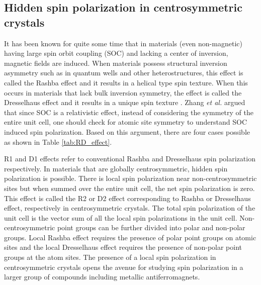 \documentclass[letterpaper,10pt,doublespacing,edeposit]{uiucthesis2020}
\begin{document}
\begin{mainmatter}
\section{Hidden spin polarization in centrosymmetric crystals}

It has been known for quite some time that in materials (even non-magnetic) having large spin orbit coupling (SOC) and lacking a center of inversion, magnetic fields are induced. When materials possess structural inversion asymmetry such as in quantum wells and other heterostructures, this effect is called the Rashba effect and it results in a helical type spin texture. When this occurs in materials that lack bulk inversion symmetry, the effect is called the Dresselhaus effect and it results in a unique spin texture \cite{Zhang2014}. Zhang \emph{et al.} \cite{Zhang2014} argued that since SOC is a relativistic effect, instead of considering the symmetry of the entire unit cell, one should check for atomic site symmetry to understand SOC induced spin polarization. Based on this argument, there are four cases possible as shown in Table \ref{tab:RD_effect}.

R1 and D1 effects refer to conventional Rashba and Dresselhaus spin polarization respectively. In materials that are globally centrosymmetric, hidden spin polarization is possible. There is local spin polarization near non-centrosymmetric sites but when summed over the entire unit cell, the net spin polarization is zero. This effect is called the R2 or D2 effect corresponding to Rashba or Dresselhaus effect, respectively in centrosymmetric crystals. The total spin polarization of the unit cell is the vector sum of all the local spin polarizations in the unit cell. Non-centrosymmetric point groups can be further divided into polar and non-polar groups. Local Rashba effect requires the presence of polar point groups on atomic sites and the local Dresselhaus effect requires the presence of non-polar point groups at the atom sites. The presence of a local spin polarization in centrosymmetric crystals opens the avenue for studying spin polarization in a larger group of compounds including metallic antiferromagnets.


\end{mainmatter}
\end{document}
